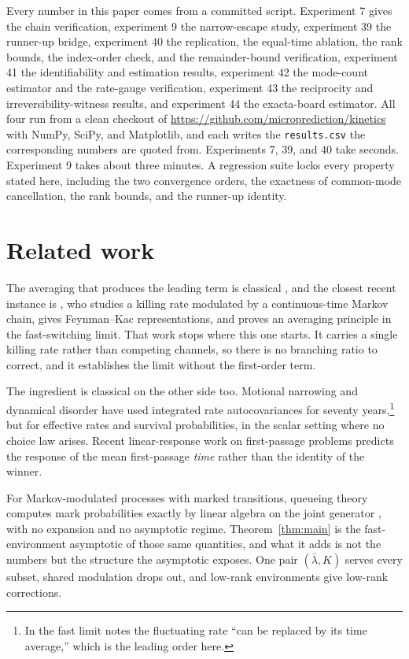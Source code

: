 \documentclass[11pt]{article}
\theoremstyle{remark}
\newcommand{\lbar}{\bar{\lambda}}
\begin{document}
Every number in this paper comes from a committed script. Experiment 7 gives
the chain verification, experiment 9 the narrow-escape study, experiment 39 the
runner-up bridge, experiment 40 the replication, the equal-time ablation, the
rank bounds, the index-order check, and the remainder-bound verification,
experiment 41 the identifiability and estimation results, experiment 42
the mode-count estimator and the rate-gauge verification, experiment 43
the reciprocity and irreversibility-witness results, and experiment 44 the
exacta-board estimator. All four run from a clean checkout
of \url{https://github.com/microprediction/kinetics} with NumPy, SciPy, and
Matplotlib, and each writes the \texttt{results.csv} the corresponding numbers
are quoted from. Experiments 7, 39, and 40 take seconds. Experiment 9 takes
about three minutes. A regression suite locks every property stated here,
including the two convergence orders, the exactness of common-mode
cancellation, the rank bounds, and the runner-up identity.

\section{Related work}

The averaging that produces the leading term is classical
\citep{khasminskii1966,kurtz1973,pavliotis2008,yin1998}, and the closest recent
instance is \citet{colantoni2026}, who studies a killing rate modulated by a
continuous-time Markov chain, gives Feynman--Kac representations, and proves an
averaging principle in the fast-switching limit. That work stops where this one
starts. It carries a single killing rate rather than competing channels, so
there is no branching ratio to correct, and it establishes the limit without the
first-order term.

The ingredient is classical on the other side too. Motional narrowing
\citep{anderson1954,kubo1954,vankampen1974} and dynamical disorder
\citep{zwanzig1990,szabo1982} have used integrated rate autocovariances for
seventy years,\footnote{In the fast limit \citet{zwanzig1990} notes the
fluctuating rate ``can be replaced by its time average,'' which is the leading
order here.} but for effective rates and survival probabilities, in the scalar
setting where no choice law arises. Recent linear-response work on first-passage
problems predicts the response of the mean first-passage \emph{time} rather
than the identity of the winner.

For Markov-modulated processes with marked transitions, queueing theory
computes mark probabilities exactly by linear algebra on the joint generator
\citep{fischer1993,heneuts1998}, with no expansion and no asymptotic
regime. Theorem~\ref{thm:main} is the fast-environment asymptotic of
those same quantities, and what it adds is not the numbers but the structure the
asymptotic exposes. One pair $(\lbar, K)$ serves every subset, shared modulation
drops out, and low-rank environments give low-rank corrections.
\end{document}
